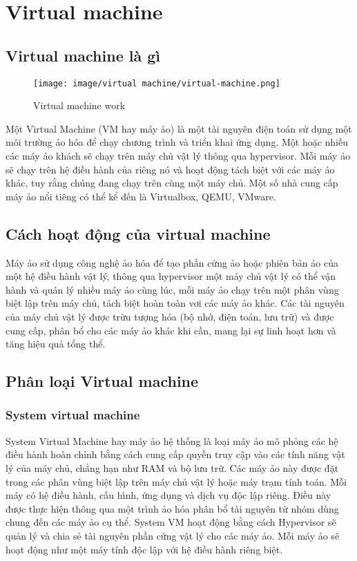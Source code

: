 \documentclass[a4paper,12pt]{article}
\begin{document}
\section{Virtual machine}
\subsection{ Virtual machine là gì}



\begin{figure}[h]
    \centering
    \texttt{[image: image/virtual machine/virtual-machine.png]}
    \caption{Virtual machine work}
    \label{fig:ten_hinh}
\end{figure}


Một Virtual Machine (VM hay máy ảo) là một tài nguyên điện toán sử dụng một môi trường ảo hóa để 
chạy chương trình và triển khai ứng dụng. Một hoặc nhiều các máy ảo khách sẽ chạy trên máy chủ vật lý thông qua hypervisor. Mỗi máy ảo sẽ chạy trên hệ điều hành của riêng nó và hoạt động tách biệt với các máy ảo khác, tuy rằng chúng đang chạy trên cùng một máy chủ. Một số nhà cung cấp máy ảo nổi tiêng có thể kể đến là Virtualbox, QEMU, VMware.

\subsection{ Cách hoạt động của virtual machine}
Máy ảo sử dụng công nghệ ảo hóa để tạo phần cứng ảo hoặc phiên bản ảo của một hệ điều hành vật lý, thông qua hypervisor một máy chủ vật lý có thể  vận hành và quản lý nhiều máy ảo cùng lúc, mỗi máy ảo chạy trên một phân vùng biệt lập trên máy chủ, tách biệt hoàn toàn vơi các máy ảo khác. Các tài nguyên của máy chủ vật lý được trừu tượng hóa (bộ nhớ, điện toán, lưu trữ) và được cung cấp, phân bổ cho các máy ảo khác khi cần, mang lại sự linh hoạt hơn và tăng hiệu
quả tổng thể.\\




\subsection{ Phân loại Virtual machine}
\subsubsection{ System virtual machine}

System Virtual Machine hay máy ảo hệ thống là loại máy ảo mô phỏng các hệ điều hành hoàn chỉnh bằng cách cung
cấp quyền truy cập vào các tính năng vật lý của máy chủ, chẳng hạn như RAM và bộ lưu trữ. Các máy ảo này được
đặt trong các phân vùng biệt lập trên máy chủ vật lý hoặc máy trạm tính toán. Mỗi máy có hệ điều hành, cấu hình,
ứng dụng và dịch vụ độc lập riêng. Điều này được thực hiện thông qua một trình ảo hóa phân bổ tài nguyên từ nhóm
dùng chung đến các máy ảo cụ thể.
System VM hoạt động bằng cách Hypervisor sẽ quản lý và chia sẻ tài nguyên phần cứng vật lý cho các máy ảo. Mỗi máy ảo sẽ hoạt động như một máy tính độc lập với hệ điều hành riêng biệt. 
\end{document}
